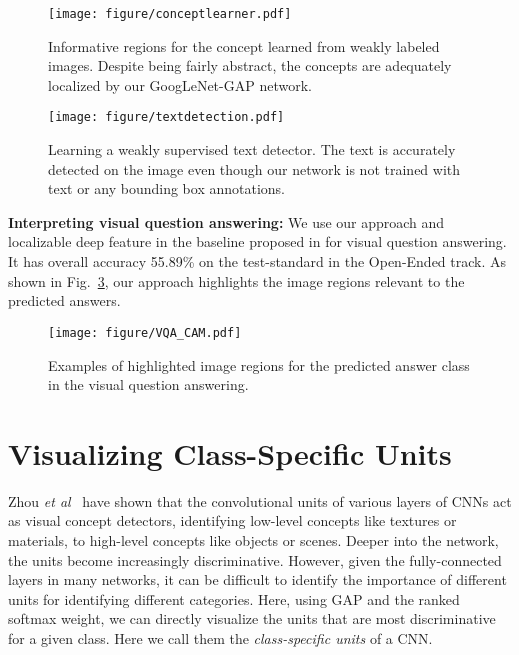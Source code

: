 \documentclass[10pt,twocolumn,letterpaper]{article}
\begin{document}
\begin{figure}
\begin{center}
\texttt{[image: figure/conceptlearner.pdf]}
\end{center}
\vspace*{-4mm}
\caption{Informative regions for the concept learned from weakly labeled images. Despite being fairly abstract, the concepts are adequately localized by our GoogLeNet-GAP network.}
\label{fig:conceptlearner}
\end{figure}

\begin{figure}
\begin{center}
\texttt{[image: figure/textdetection.pdf]}
\end{center}
\vspace*{-4mm}
\caption{Learning a weakly supervised text detector. The text is accurately detected on the image even though our network is not trained with  text or any bounding box annotations.}
\label{fig:textdetection}
\end{figure}

 
 \textbf{Interpreting visual question answering:} We use our approach and localizable deep feature in the baseline proposed in \cite{zhou2015vqa} for visual question answering. It has overall accuracy 55.89\% on the test-standard in the Open-Ended track. As shown in Fig.~\ref{fig:vqa}, our approach highlights the image regions relevant to the predicted answers.

\begin{figure}
\begin{center}
\texttt{[image: figure/VQA\_CAM.pdf]}
\end{center}
\caption{Examples of highlighted image regions for the predicted answer class in the visual question answering.}
\label{fig:vqa}
\end{figure}

\section{Visualizing Class-Specific Units}

Zhou \textit{et al}~\cite{zhou2014object} have shown that the convolutional units of various layers of CNNs act as visual concept detectors, identifying  low-level concepts like textures or materials, to high-level concepts like objects or scenes. Deeper into the network, the units become increasingly discriminative. However, given the fully-connected layers in many networks, it can be difficult to identify the importance of different units for identifying different categories. Here, using GAP and the ranked softmax weight, we can directly visualize the units that are most discriminative for a given class. Here we call them the \textit{class-specific units} of a CNN. 
\end{document}
